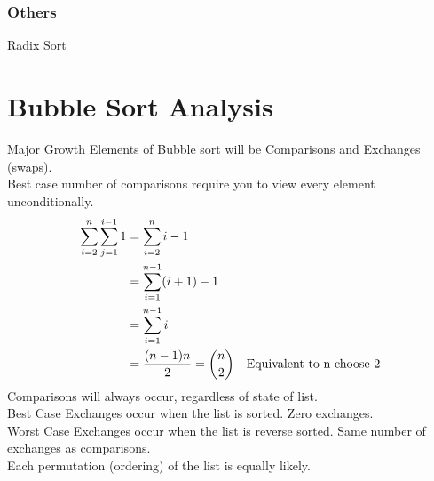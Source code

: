 \documentclass[english, 10pt]{article}
\begin{document}
\subsubsection{Others}
    Radix Sort


\section{Bubble Sort Analysis}
\begin{algorithm}
\end{algorithm}

Major Growth Elements of Bubble sort will be Comparisons and Exchanges (swaps).\\

Best case number of comparisons require you to view every element unconditionally. \\
\begin{align*}
    \sum_{i=2}^n \sum_{j=1}^{i-1} 1 &= \sum_{i=2}^{n} i-1 \\
    &= \sum_{i=1}^{n-1} (i+1) -1 \\
    &= \sum_{i=1}^{n-1} i \\
    &= \frac{(n-1)n}{2} = \binom{n}{2}& \text{Equivalent to n choose 2}
\end{align*}
Comparisons will always occur, regardless of state of list. \\

Best Case Exchanges occur when the list is sorted. Zero exchanges. \\
Worst Case Exchanges occur when the list is reverse sorted. Same number of exchanges as comparisons. \\

 Each permutation (ordering) of the list is equally likely.
\end{document}
